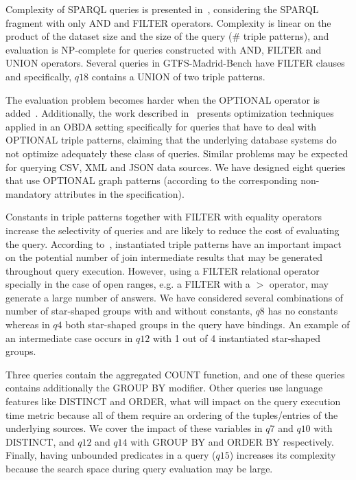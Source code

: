 Complexity of SPARQL queries is presented in~\citep{perez2009semantics}, considering the SPARQL fragment with only AND and FILTER operators. Complexity is linear on the product of the dataset size and the size of the query (\# triple patterns), and evaluation is NP-complete for queries constructed with AND, FILTER and UNION operators. Several queries in GTFS-Madrid-Bench have FILTER clauses and specifically, $q18$ contains a UNION of two triple patterns.

The evaluation problem becomes harder when the OPTIONAL operator is added~\citep{perez2009semantics}. Additionally, the work described in~\citep{xiao2018efficient} presents optimization techniques applied in an OBDA setting specifically for queries that have to deal with OPTIONAL triple patterns, claiming that the underlying database systems do not optimize adequately these class of queries. Similar problems may be expected for querying CSV, XML and JSON data sources. We have designed eight queries that use OPTIONAL graph patterns (according to the corresponding non-mandatory attributes in the specification). 

Constants in triple patterns together with FILTER with equality operators increase the selectivity of queries and are likely to reduce the cost of evaluating the query. According to~\citep{montoya2012benchmarking}, instantiated triple patterns have an important impact on the potential number of join intermediate results that may be generated throughout query execution. However, using a FILTER relational operator specially in the case of open ranges, e.g. a FILTER with a $>$ operator, may generate a large number of answers. We have considered several combinations of number of star-shaped groups with and without constants, $q8$ has no constants whereas in $q4$ both star-shaped groups in the query have bindings. An example of an intermediate case occurs in $q12$ with 1 out of 4 instantiated star-shaped groups. 

Three queries contain the aggregated COUNT function, and one of these queries contains additionally the GROUP BY modifier. Other queries use language features like DISTINCT and ORDER, what will impact on the query execution time metric because all of them require an ordering of the tuples/entries of the underlying sources. We cover the impact of these variables in $q7$ and $q10$ with DISTINCT, and $q12$ and $q14$ with GROUP BY and ORDER BY respectively. Finally, having unbounded predicates in a query ($q15$) increases its complexity because the search space during query evaluation may be large. 

